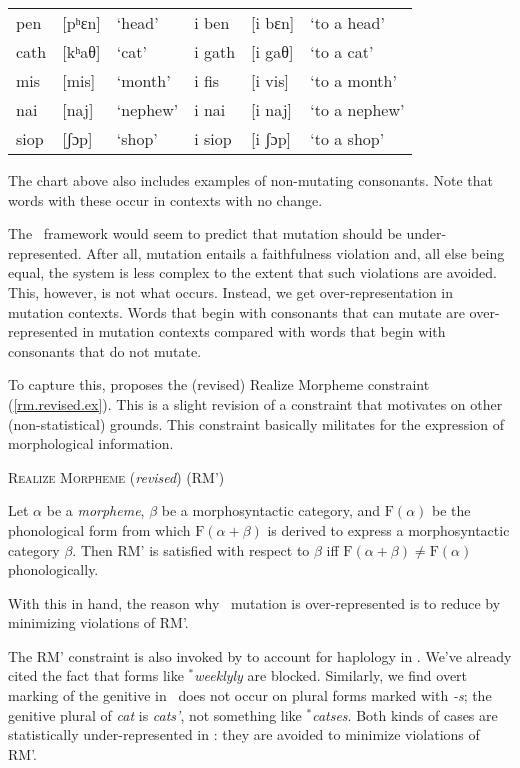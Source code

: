 \documentclass[output=paper,
modfonts
]{LSP/langsci}
\begin{document}
\ea
\begin{tabular}[t]{llllll}
pen  & [pʰɛn] & `head'   & i ben  & [i bɛn] & `to a head' \\
cath & [kʰaθ] & `cat'    & i gath & [i gaθ] & `to a cat' \\
mis  & [mis]  & `month'  & i fis  & [i vis] & `to a month' \\
nai  & [naj]  & `nephew' & i nai  & [i naj] & `to a nephew' \\
siop & [ʃɔp]  & `shop'   & i siop & [i ʃɔp] & `to a shop'
\end{tabular}
\z

\noindent The chart above also includes examples of non-mutating consonants. Note that words with these occur in  contexts with no change.

The \io\ framework would seem to predict that mutation should be under-represented. After all, mutation entails a faithfulness violation and, all else being equal, the system is less complex to the extent that such violations are avoided. This, however, is not what occurs. Instead, we get over-representation in mutation contexts. Words that begin with consonants that can mutate are over-represented in mutation contexts compared with words that begin with consonants that do not mutate.

To capture this, \citet{inopt.phon} proposes the (revised) Realize Morpheme constraint (\ref{rm.revised.ex}). This is a slight revision of a constraint that \citet{kurisu} motivates on other (non-statistical) grounds. This constraint basically militates for the expression of morphological information.

\ea
\label{rm.revised.ex}
\textsc{Realize Morpheme} (\emph{revised}) (RM')

Let $\alpha$ be a \emph{morpheme}, $\beta$ be a morphosyntactic category, and $\mathrm F(\alpha)$ be the phonological form from which $\mathrm F(\alpha+\beta)$ is derived to express a morphosyntactic category $\beta$. Then RM' is satisfied with respect to $\beta$ iff $\mathrm F(\alpha+\beta)\ne\mathrm F(\alpha)$ phonologically.
\z

\noindent With this in hand, the reason why \w\ mutation is over-represented is to reduce  by minimizing violations of RM'.

The RM' constraint is also invoked by \citet{inopt.phon} to account for haplology in \e. We've already cited the fact that forms like ${}^*$\emph{weeklyly} are blocked. Similarly, we find overt marking of the genitive in \e\ does not occur on plural forms marked with \emph{-s}; the genitive plural of \emph{cat} is \emph{cats'}, not something like ${}^*$\emph{catses}. Both kinds of cases are statistically under-represented in \e: they are avoided to minimize violations of RM'.
\end{document}

